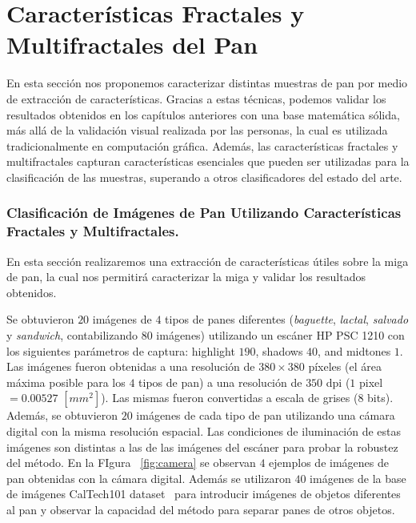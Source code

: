 \chapter[Características Fractales del Pan]{Características Fractales y Multifractales del Pan}

En esta sección nos proponemos caracterizar distintas muestras de pan por medio de extracción de características.
Gracias a estas t\'ecnicas, podemos validar los resultados obtenidos en los cap\'itulos anteriores con una base matem\'atica s\'olida, m\'as all\'a de la validaci\'on visual realizada por las personas, la cual es utilizada tradicionalmente en computaci\'on gr\'afica.
Además, las características fractales y multifractales capturan características esenciales que pueden ser utilizadas para la clasificación de las muestras, superando a otros clasificadores del estado del arte.



\subsection{Clasificación de Imágenes de Pan Utilizando Características Fractales y Multifractales.}



En esta sección realizaremos una extracción de características útiles sobre la miga de pan, la cual nos permitirá caracterizar la miga y validar los resultados obtenidos.


Se obtuvieron $20$ imágenes de $4$ tipos de panes diferentes ({\em baguette}, {\em lactal}, {\em salvado} y {\em sandwich}, contabilizando $80$ imágenes) utilizando un escáner HP PSC 1210 con los siguientes parámetros de captura:  highlight $190$, shadows $40$, and midtones $1$. Las imágenes fueron obtenidas a una resolución de $380\times 380$ píxeles (el área máxima posible para los $4$ tipos de pan) a una resolución de $350$ dpi ($1$ pixel $= 0.00527$ $[mm^{2}]$). Las mismas fueron convertidas a escala de grises ($8$ bits). Además, se obtuvieron $20$ imágenes de cada tipo de pan utilizando una cámara digital con la misma resolución espacial. Las condiciones de iluminación de estas imágenes son distintas a las de las imágenes del escáner para probar la robustez del método. En la FIgura ~\ref{fig:camera} se observan $4$ ejemplos de imágenes de pan obtenidas con la cámara digital. Además se utilizaron $40$ imágenes de la base de imágenes CalTech101 dataset~\cite{FeiFei04} para introducir imágenes de objetos diferentes al pan y observar la capacidad del método para separar panes de otros objetos.

